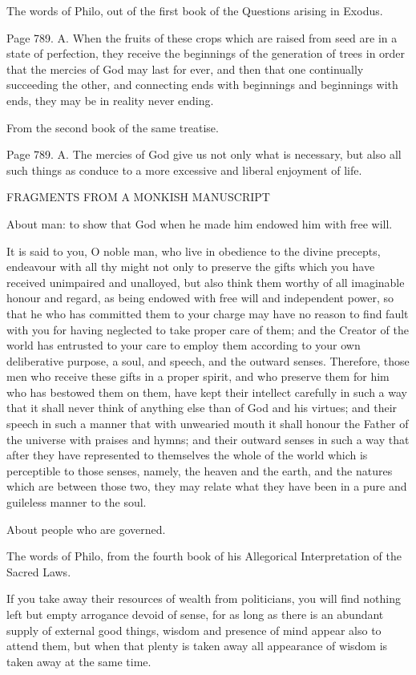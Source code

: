 The words of Philo, out of the first book of the Questions arising in Exodus.

Page 789. A. When the fruits of these crops which are raised from seed are in a state of
perfection, they receive the beginnings of the generation of trees in order that the mercies of God
may last for ever, and then that one continually succeeding the other, and connecting ends with
beginnings and beginnings with ends, they may be in reality never ending.

From the second book of the same treatise.

Page 789. A. The mercies of God give us not only what is necessary, but also all such things as
conduce to a more excessive and liberal enjoyment of life.

FRAGMENTS FROM A MONKISH MANUSCRIPT

About man: to show that God when he made him endowed him with free will.

It is said to you, O noble man, who live in obedience to the divine precepts, endeavour with all thy
might not only to preserve the gifts which you have received unimpaired and unalloyed, but also
think them worthy of all imaginable honour and regard, as being endowed with free will and
independent power, so that he who has committed them to your charge may have no reason to find
fault with you for having neglected to take proper care of them; and the Creator of the world has
entrusted to your care to employ them according to your own deliberative purpose, a soul, and
speech, and the outward senses. Therefore, those men who receive these gifts in a proper spirit,
and who preserve them for him who has bestowed them on them, have kept their intellect carefully
in such a way that it shall never think of anything else than of God and his virtues; and their speech
in such a manner that with unwearied mouth it shall honour the Father of the universe with praises
and hymns; and their outward senses in such a way that after they have represented to
themselves the whole of the world which is perceptible to those senses, namely, the heaven and
the earth, and the natures which are between those two, they may relate what they have been in a
pure and guileless manner to the soul.

About people who are governed.

The words of Philo, from the fourth book of his Allegorical Interpretation of the Sacred Laws.

If you take away their resources of wealth from politicians, you will find nothing left but empty
arrogance devoid of sense, for as long as there is an abundant supply of external good things,
wisdom and presence of mind appear also to attend them, but when that plenty is taken away all
appearance of wisdom is taken away at the same time.

